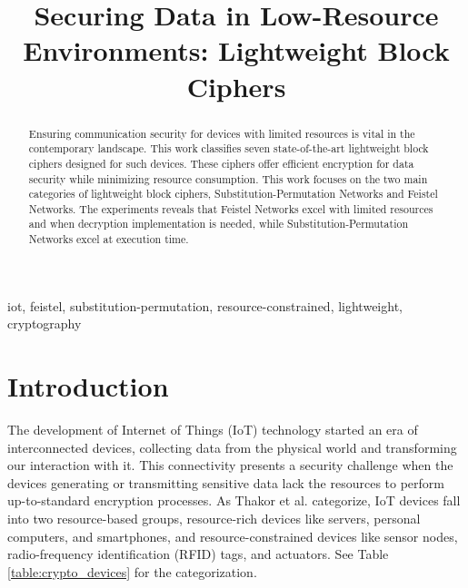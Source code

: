 \documentclass[conference]{IEEEtran}
\begin{document}
\title{Securing Data in Low-Resource Environments: Lightweight Block Ciphers}


\author{
\and
{}
}


\maketitle

\begin{abstract}
    Ensuring communication security for devices with limited resources is vital in the contemporary landscape. This work classifies seven state-of-the-art lightweight block ciphers designed for such devices. These ciphers offer efficient encryption for data security while minimizing resource consumption. This work focuses on the two main categories of lightweight block ciphers, Substitution-Permutation Networks and Feistel Networks. The experiments reveals that Feistel Networks excel with limited resources and when decryption implementation is needed, while Substitution-Permutation Networks excel at execution time.
\end{abstract}

\begin{IEEEkeywords}
iot, feistel, substitution-permutation, resource-constrained, lightweight, cryptography
\end{IEEEkeywords}

\section{Introduction}\label{sec:intro}

The development of Internet of Things (IoT) technology started an era of interconnected devices, collecting data from the physical world and transforming our interaction with it. This connectivity presents a security challenge when the devices generating or transmitting sensitive data lack the resources to perform up-to-standard encryption processes. As Thakor et al. \cite{IoT_1} categorize, IoT devices fall into two resource-based groups, resource-rich devices like servers, personal computers, and smartphones, and resource-constrained devices like sensor nodes, radio-frequency identification (RFID) tags, and actuators. See Table \ref{table:crypto_devices} for the categorization.
\end{document}
